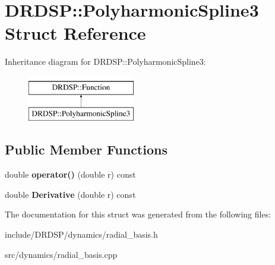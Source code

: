 \hypertarget{struct_d_r_d_s_p_1_1_polyharmonic_spline3}{\section{D\-R\-D\-S\-P\-:\-:Polyharmonic\-Spline3 Struct Reference}
\label{struct_d_r_d_s_p_1_1_polyharmonic_spline3}
}
Inheritance diagram for D\-R\-D\-S\-P\-:\-:Polyharmonic\-Spline3\-:\begin{figure}[H]
\begin{center}
\leavevmode
\includegraphics[height=2.000000cm]{struct_d_r_d_s_p_1_1_polyharmonic_spline3}
\end{center}
\end{figure}
\subsection*{Public Member Functions}
\begin{DoxyCompactItemize}
\item 
\hypertarget{struct_d_r_d_s_p_1_1_polyharmonic_spline3_aefc5eef7e68a6cf816a46e9952e3d990}{double {\bfseries operator()} (double r) const }\label{struct_d_r_d_s_p_1_1_polyharmonic_spline3_aefc5eef7e68a6cf816a46e9952e3d990}

\item 
\hypertarget{struct_d_r_d_s_p_1_1_polyharmonic_spline3_a96ce1e41bbc790d39fa51d806d6fad10}{double {\bfseries Derivative} (double r) const }\label{struct_d_r_d_s_p_1_1_polyharmonic_spline3_a96ce1e41bbc790d39fa51d806d6fad10}

\end{DoxyCompactItemize}


The documentation for this struct was generated from the following files\-:\begin{DoxyCompactItemize}
\item 
include/\-D\-R\-D\-S\-P/dynamics/radial\-\_\-basis.\-h\item 
src/dynamics/radial\-\_\-basis.\-cpp\end{DoxyCompactItemize}
